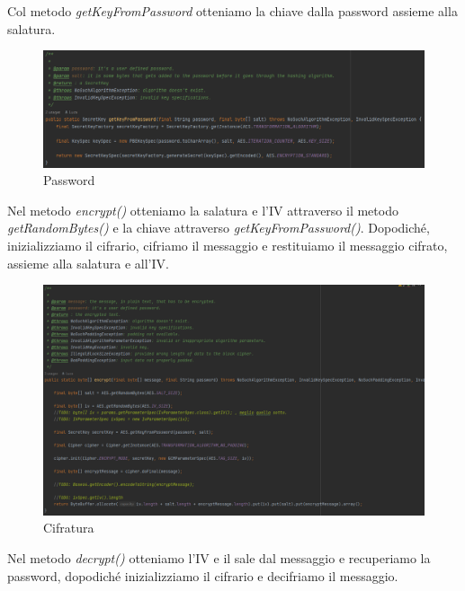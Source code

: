 \textsf{\small Col metodo \emph{getKeyFromPassword} otteniamo la chiave dalla password assieme alla salatura.}

\begin{figure}[H]
	\centering
	\includegraphics[width=1\textwidth, height=1\textheight, keepaspectratio]{./images/code/java/getKeyFromPassword.PNG}
	\caption{Password}
	\label{fig:getKeyFromPassword}
\end{figure}

 

\textsf{\small Nel metodo \emph{encrypt()} otteniamo la salatura e l'IV attraverso il metodo \emph{getRandomBytes()} e la chiave attraverso \emph{getKeyFromPassword()}. Dopodiché, inizializziamo il cifrario, cifriamo il messaggio e restituiamo il messaggio cifrato, assieme alla salatura e all'IV.} 

\begin{figure}[H]
	\centering
	\includegraphics[width=1\textwidth, height=1\textheight, keepaspectratio]{./images/code/java/encrypt.PNG}
	\caption{Cifratura}
	\label{fig:encrypt_java}
\end{figure}

 

\textsf{\small Nel metodo \emph{decrypt()} otteniamo l'IV e il sale dal messaggio e recuperiamo la password, dopodiché inizializziamo il cifrario e decifriamo il messaggio.} 

